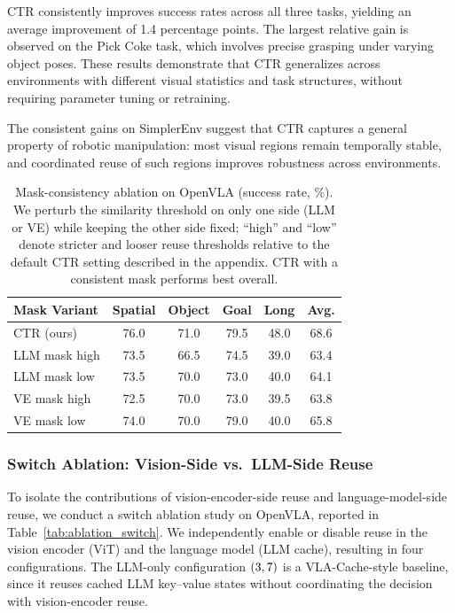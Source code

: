 \documentclass[11pt]{article}
\newcommand{\cmark}{\ding{51}}
\newcommand{\xmark}{\ding{55}}
\begin{document}
CTR consistently improves success rates across all three tasks, yielding an average improvement of 1.4 percentage points. The largest relative gain is observed on the Pick Coke task, which involves precise grasping under varying object poses. These results demonstrate that CTR generalizes across environments with different visual statistics and task structures, without requiring parameter tuning or retraining.

The consistent gains on SimplerEnv suggest that CTR captures a general property of robotic manipulation: most visual regions remain temporally stable, and coordinated reuse of such regions improves robustness across environments.




\begin{table}[t]
\centering
\small
\setlength{\tabcolsep}{4pt}
\begin{tabular}{lccccc}
\toprule
\textbf{Mask Variant} & \textbf{Spatial} & \textbf{Object} & \textbf{Goal} & \textbf{Long} & \textbf{Avg.} \\
\midrule
CTR (ours) & 76.0 & 71.0 & 79.5 & 48.0 & 68.6 \\
LLM mask high & 73.5 & 66.5 & 74.5 & 39.0 & 63.4 \\
LLM mask low & 73.5 & 70.0 & 73.0 & 40.0 & 64.1 \\
VE mask high & 72.5 & 70.0 & 73.0 & 39.5 & 63.8 \\
VE mask low & 74.0 & 70.0 & 79.0 & 40.0 & 65.8 \\
\bottomrule
\end{tabular}
\caption{Mask-consistency ablation on OpenVLA (success rate, \%). We perturb the similarity threshold on only one side (LLM or VE) while keeping the other side fixed; ``high'' and ``low'' denote stricter and looser reuse thresholds relative to the default CTR setting described in the appendix. CTR with a consistent mask performs best overall.}
\label{tab:ablation_mask}
\end{table}




\subsubsection{Switch Ablation: Vision-Side vs.\ LLM-Side Reuse}

To isolate the contributions of vision-encoder-side reuse and language-model-side reuse, we conduct a switch ablation study on OpenVLA, reported in Table~\ref{tab:ablation_switch}. We independently enable or disable reuse in the vision encoder (ViT) and the language model (LLM cache), resulting in four configurations. The LLM-only configuration $(\cmark,\xmark)$ is a VLA-Cache-style baseline, since it reuses cached LLM key--value states without coordinating the decision with vision-encoder reuse.
\end{document}
